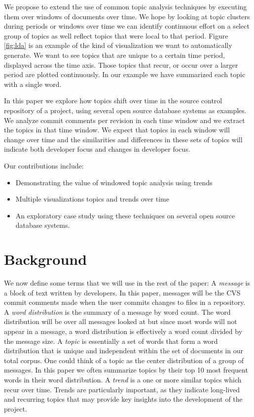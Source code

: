 \documentclass[times, 10pt,twocolumn]{article}
\begin{document}
We propose to extend the use of common topic analysis techniques by
executing them over windows of documents over time. We hope by looking
at topic clusters during periods or windows over time we can identify
continuous effort on a select group of topics as well reflect topics
that were local to that period. Figure \ref{fig:lda} is an example of
the kind of visualization we want to automatically generate. We want
to see topics that are unique to a certain time period, displayed
across the time axis. Those topics that recur, or occur over a
larger period are plotted continuously. In our example we have
summarized each topic with a single word.

In this paper we explore how topics shift over time in the source
control repository of a project, using several open source database
systems as examples. We analyze commit comments per revision in each
time window and we extract the topics in that time window. We expect
that topics in each window will change over time and the similarities
and differences in these sets of topics will indicate both developer
focus and changes in developer focus.

Our contributions include:
\begin{itemize}
\item Demonstrating the value of windowed topic analysis using trends
\item Multiple visualizations topics and trends over time
\item An exploratory case study using these techniques on several open source database systems.
\end{itemize}


\section{Background}

We now define some terms that we will use in the rest of the paper: A
\emph{message} is a block of text written by developers. In this
paper, messages will be the CVS commit comments made when the user
commits changes to files in a repository. A \emph{word distribution}
is the summary of a message by word count. The word distribution will
be over all messages looked at but since most words will not appear in
a message, a word distribution is effectively a word count divided by
the message size. A \emph{topic} is essentially a set of words that
form a word distribution that is unique and independent within the set
of documents in our total corpus. One could think of a topic as the
center distribution of a group of messages. In this paper we often
summarize topics by their top 10 most frequent words in their word
distribution.  A \emph{trend} is a one or more similar topics which
recur over time.  Trends are particularly important, as they indicate
long-lived and recurring topics that may provide key insights into the
development of the project.
\end{document}
